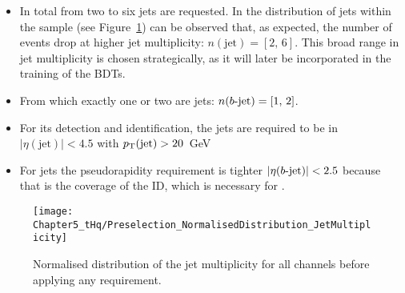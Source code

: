 \begin{itemize}
	\item In total from two to six jets are requested. In the distribution of jets within the \tHq sample 
	(see Figure~\ref{fig:ChaptH::EventSelection:PRJetMultiplicity})
	can be observed that, as expected, the number of \tHq events drop at higher jet multiplicity: $n(\text{jet})=[2,\,6]$.
	This broad range in jet multiplicity is chosen strategically, as it will later be  incorporated
	in the training of the BDTs.
	\item From which exactly one or two are \btagged jets: $n(b\text{-jet})=[1,\,2]$.
	\item For its detection and identification, the jets are required to be in $|\eta(\text{jet})|<4.5$ with $p_{\text{T}}(\text{jet})>20$~GeV
	\item For \btagged jets the pseudorapidity requirement is tighter $|\eta(b\text{-jet})|<2.5$ because that is the
	coverage of the ID, which is necessary for \btag.
\end{itemize}

\begin{figure}[h]
\centering
\texttt{[image: Chapter5\_tHq/Preselection\_NormalisedDistribution\_JetMultiplicity]}
\caption{Normalised distribution of the jet multiplicity for all \tHq channels before applying any requirement.}
\label{fig:ChaptH::EventSelection:PRJetMultiplicity}
\end{figure}


\begin{comment}
\begin{figure}
\centering
\begin{subfigure}{.5\textwidth}
  \centering
  \texttt{[image: Chapter1/single\_top\_pTvsEta\_bquark]}
  \caption{Bottom quark from the top-quark decay.}
  \label{fig:Chap1:top:singletop:tchannel:ptVSeta:b}
\end{subfigure}%
\begin{subfigure}{.5\textwidth}
  \centering
  \texttt{[image: Chapter1/single\_top\_pTvsEta\_SECOND\_bquark]}
  \caption{Second bottom-quark.}
  \label{fig:Chap1:top:singletop:tchannel:ptVSeta:second_B}
\end{subfigure}
\caption{Truth-level kinematic $\pT$ vs $\eta$ distributions for the two \Pbottom quarks 
in the single top-quark \tchannel process.
In (a) the \Pbottom quark originated from the decay of the top quark. In (b) the second \Pbottom quark, 
which is the one arising from a gluon splitting into a \bbar pair. The simulated events were requirements 
produced within the 4FS using \PROTOS LO generator~\cite{ATLAS:2017rcx}. As can be seen, 
in most of cases the second \Pbottom quark is produced with vey low \pT and, consequently, it does not pass the 
lepton-trigger requirements and, hence, it is not detected at ATLAS. A similar distribution for the \tHq process is presented
in Figure~\ref{fig:tHq:pTvsEta_bQuark}.}
\label{fig:Chap1:top:singletop:tchannel:ptVSeta}
\end{figure}
\end{comment}

